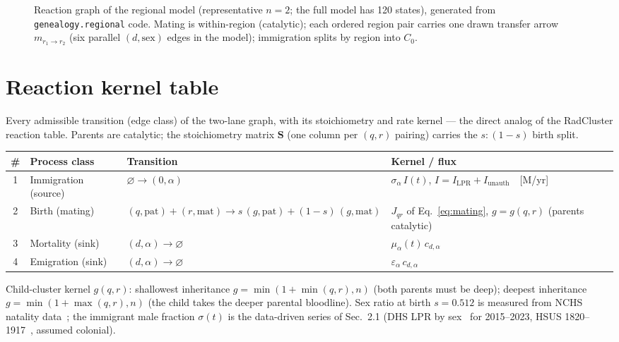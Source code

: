 \documentclass[11pt,a4paper]{article}
\begin{document}
\begin{figure}[htbp]
\centering
\resizebox{0.6\textwidth}{!}{}
\caption{Reaction graph of the regional model (representative $n=2$;
the full model has 120 states), generated from
\texttt{genealogy.regional} code.  Mating is within-region (catalytic);
each ordered region pair carries one drawn transfer arrow
$m_{r_1\to r_2}$ (six parallel $(d,\mathrm{sex})$ edges in the model);
immigration splits by region into $C_0$.}
\label{fig:rag-regional}
\end{figure}


\section{Reaction kernel table}
Every admissible transition (edge class) of the two-lane graph, with its
stoichiometry and rate kernel --- the direct analog of the RadCluster
reaction table.  Parents are catalytic; the stoichiometry matrix
$\mathbf{S}$ (one column per $(q,r)$ pairing) carries the $s:(1-s)$ birth
split.

\begin{center}
\small
\begin{tabular}{@{}clll@{}}
\toprule
\# & Process class & Transition & Kernel / flux \\
\midrule
1 & Immigration (source) & $\varnothing \to (0,\alpha)$
    & $\sigma_\alpha\,I(t)$, $I=I_{\mathrm{LPR}}+I_{\mathrm{unauth}}$~~[M/yr] \\
2 & Birth (mating) & $(q,\mathrm{pat}){+}(r,\mathrm{mat})
    \to s\,(g,\mathrm{pat}){+}(1{-}s)\,(g,\mathrm{mat})$
    & $J_{qr}$ of Eq.~\eqref{eq:mating}, $g=g(q,r)$ (parents catalytic) \\
3 & Mortality (sink) & $(d,\alpha) \to \varnothing$
    & $\mu_\alpha(t)\,c_{d,\alpha}$ \\
4 & Emigration (sink) & $(d,\alpha) \to \varnothing$
    & $\varepsilon_\alpha\,c_{d,\alpha}$ \\
\bottomrule
\end{tabular}
\end{center}
Child-cluster kernel $g(q,r)$: shallowest inheritance $g=\min(1+\min(q,r),n)$
(both parents must be deep); deepest inheritance $g=\min(1+\max(q,r),n)$
(the child takes the deeper parental bloodline).
Sex ratio at birth $s=0.512$ is measured from NCHS natality
data~\cite{nchs-natality}; the immigrant male fraction $\sigma(t)$ is the
data-driven series of Sec.~2.1 (DHS LPR by sex~\cite{dhs-lpr-sex} for
2015--2023, HSUS 1820--1917~\cite{hsus-immig}, assumed colonial).
\end{document}
